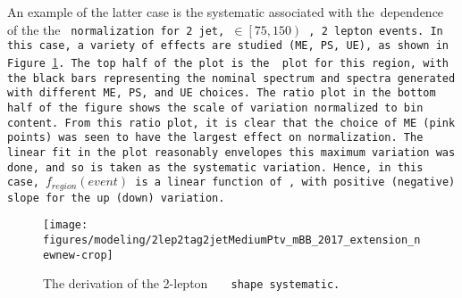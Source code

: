 An example of the latter case is the systematic associated with the \mbb\,dependence of the the \tt\,normalization for 2 jet, \ptv$\in\left[75,150\right)$ \GeV, 2 lepton events.  In this case, a variety of effects are studied (ME, PS, UE), as shown in Figure \ref{fig:ttbarmbbl2eg}.  The top half of the plot is the \mbb\,plot for this region, with the black bars representing the nominal spectrum and spectra generated with different ME, PS, and UE choices.  The ratio plot in the bottom half of the figure shows the scale of variation normalized to bin content.  From this ratio plot, it is clear that the choice of ME (pink points) was seen to have the largest effect on normalization.  The linear fit in the plot reasonably envelopes this maximum variation was done, and so is taken as the systematic variation.  Hence, in this case, $f_{region}\left(event\right)$ is a linear function of \mbb, with positive (negative) slope for the up (down) variation.  

\begin{figure}[!htbp]\captionsetup{justification=centering}
  \centering
  \centering\texttt{[image: figures/modeling/2lep2tag2jetMediumPtv\_mBB\_2017\_extension\_newnew-crop]}
  \caption{The derivation of the 2-lepton \tt\,\mbb\, shape systematic.}
  \label{fig:ttbarmbbl2eg}
\end{figure}

